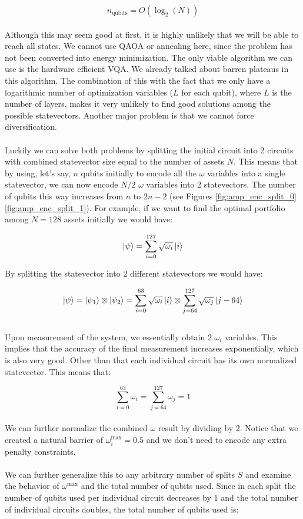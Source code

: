 \documentclass[12pt,a4paper]{report}
\begin{document}
\[
n_{\text{qubits}} = O(\log_2(N))
\]
\\
\noindent
Although this may seem good at first, it is highly unlikely that we will be able to reach all states. We cannot use QAOA or annealing here, since the problem has not been converted into energy minimization. The only viable algorithm we can use is the hardware efficient VQA. We already talked about barren plateaus in this algorithm. The combination of this with the fact that we only have a logarithmic number of optimization variables (\(L\) for each qubit), where \(L\) is the number of layers, makes it very unlikely to find good solutions among the possible statevectors. Another major problem is that we cannot force diversification.
\\
\\
\noindent
Luckily we can solve both problems by splitting the initial circuit into 2 circuits with combined statevector size equal to the number of assets \(N\). This means that by using, let's say, \(n\) qubits initially to encode all the \(\omega\) variables into a single statevector, we can now encode \(N/2\) \(\omega\) variables into 2 statevectors. The number of qubits this way increases from \(n\) to \(2n-2\) (see Figures \ref{fig:amp_enc_split_0} \ref{fig:amp_enc_split_1}). For example, if we want to find the optimal portfolio among \(N=128\) assets initially we would have:

\[
\ket{\psi} = \sum_{i=0}^{127} \sqrt{\omega_i} \ket{i}
\]

\noindent
By splitting the statevector into 2 different statevectors we would have:

\[
\ket{\psi} = \ket{\psi_1} \otimes \ket{\psi_2} = \sum_{i=0}^{63} \sqrt{\omega_i} \ket{i} \otimes \sum_{j=64}^{127} \sqrt{\omega_j} \ket{j-64}
\]
\\
\noindent
Upon measurement of the system, we essentially obtain 2 \(\omega_i\) variables. This implies that the accuracy of the final measurement increases exponentially, which is also very good. Other than that each individual circuit has its own normalized statevector. This means that:

\[
\sum_{i=0}^{63} \omega_i = \sum_{j=64}^{127} \omega_j = 1
\]
\\
\noindent
We can further normalize the combined \(\omega\) result by dividing by 2. Notice that we created a natural barrier of \(\omega_i^{\text{max}} = 0.5\) and we don't need to encode any extra penalty constraints.
\\
\\
\noindent
We can further generalize this to any arbitrary number of splits \(S\) and examine the behavior of \(\omega^{\text{max}}\) and the total number of qubits used. Since in each split the number of qubits used per individual circuit decreases by 1 and the total number of individual circuits doubles, the total number of qubits used is:
\end{document}
